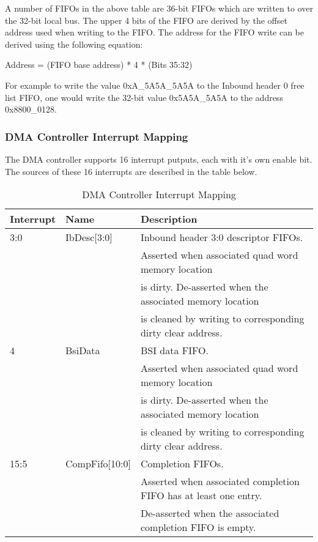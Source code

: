 \documentclass[11pt]{article}
\begin{document}
A number of FIFOs in the above table are 36-bit FIFOs which are written to over the 32-bit local bus. The upper 4 bits of the FIFO are derived by 
the offset address used when writing to the FIFO. The address for the FIFO write can be derived using the following
equation:

\begin{center}
Address = (FIFO base address) * 4 * (Bits 35:32)
\end{center}

For example to write the value 0xA\_5A5A\_5A5A to the Inbound header 0 free list FIFO, one 
would write the 32-bit value 0x5A5A\_5A5A to the address 0x8800\_0128.

\subsubsection{DMA Controller Interrupt Mapping}

The DMA controller supports 16 interrupt putputs, each with it's own enable bit. The sources of these 16 interrupts are described in the table below.

\begin{table}[H]
\small
\centering
   \begin{tabular}{| l | l | l | }
      \hline \textbf{Interrupt} & \textbf{Name}  & \textbf{Description} \\
      \hline 3:0            & IbDesc[3:0]    &  Inbound header 3:0 descriptor FIFOs. \\
                            &                &  Asserted when associated quad word memory location \\
                            &                &  is dirty. De-asserted when the associated memory location \\
                            &                &  is cleaned by writing to corresponding dirty clear address. \\
      \hline 4              & BsiData        &  BSI data FIFO.                      \\
                            &                &  Asserted when associated quad word memory location \\
                            &                &  is dirty. De-asserted when the associated memory location \\
                            &                &  is cleaned by writing to corresponding dirty clear address. \\
      \hline 15:5           & CompFifo[10:0] &  Completion FIFOs.                   \\
                            &                &  Asserted when associated completion FIFO has at least one entry. \\
                            &                &  De-asserted when the associated completion FIFO is empty. \\
      \hline
   \end{tabular}
   \caption{DMA Controller Interrupt Mapping}
   \label{tab:dma_int_mappings}
\end{table}
\end{document}
